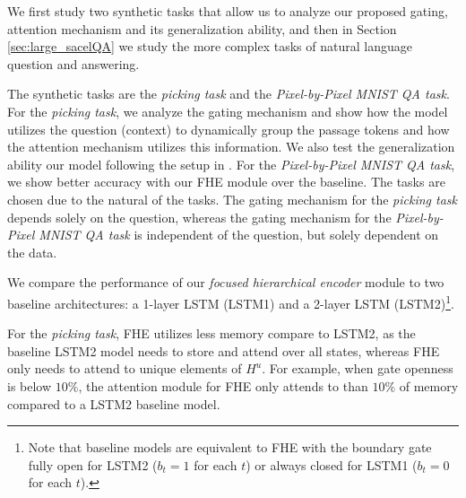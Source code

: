 We first study two synthetic tasks that allow us to analyze our proposed gating, attention mechanism and its generalization ability, and then in Section \ref{sec:large_sacelQA} we study the more complex tasks of natural language question and answering.

The synthetic tasks are the \emph{picking task} and the \emph{Pixel-by-Pixel MNIST QA task}. For the \emph{picking task}, we analyze the gating mechanism and show how the model utilizes the question (context) to dynamically group the passage tokens and how the attention mechanism utilizes this information. We also test the generalization ability our model following the setup in \cite{graves2014neural}. For the \emph{Pixel-by-Pixel MNIST QA task}, we show better accuracy with our FHE module over the baseline. The  tasks are chosen due to the natural of the tasks. The gating mechanism for the \emph{picking task} depends solely on the question, whereas the gating mechanism for the \emph{Pixel-by-Pixel MNIST QA task} is independent of the question, but solely dependent on the data.

We compare the performance of our \emph{focused hierarchical encoder} module to two baseline architectures: a 1-layer LSTM (LSTM1) and a 2-layer LSTM (LSTM2)\footnote{Note that baseline models are equivalent to FHE with the boundary gate fully open for LSTM2 ($b_t = 1$ for each $t$) or always closed for LSTM1 ($b_t = 0$ for each $t$).}. 

For the \emph{picking task}, FHE utilizes less memory compare to LSTM2, as the baseline LSTM2 model needs to store and attend over all states, whereas FHE only needs to attend to unique elements of $H^u$. For example, when gate openness is below $10\%$, the attention module for FHE only attends to than $10\%$ of memory compared to a LSTM2 baseline model.

